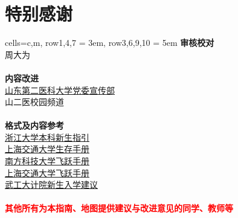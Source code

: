 \chapter*{特别感谢}
\noindent\begin{table*}[h]
    \centering
    \begin{tblr}{
        cells={c,m},
        row{1,4,7} = {3em},
        row{3,6,9,10} = {5em}
            }
        {\large\textbf{审核校对}}          \\
        {周大为}            \\
        \\
        {\large\textbf{内容改进}}                 \\
        {\uline{\href{https://xchb.sdsmu.edu.cn/}{山东第二医科大学党委宣传部}}              \\
        山二医校园频道}                                                                     \\
        \\
        {\large\textbf{格式及内容参考}}         \\
        
        {\uline{\href{https://zjuers.com/welcome/}{浙江大学本科新生指引}}\\
        \uline{\href{https://survivesjtu.gitbook.io/survivesjtumanual}{上海交通大学生存手册}} \\
        \uline{\href{https://sustech-application.com/}{南方科技大学飞跃手册}}                  \\
        \uline{\href{https://survivesjtu.github.io/SJTU-Application/}{上海交通大学飞跃手册}}  \\
        \uline{\href{https://gitee.com/hanyaner/witjij}{武工大计院新生入学建议}}}\\
        \\
        {\large\textbf{\textcolor{red}{其他所有为本指南、地图提供建议与改进意见的同学、教师等}}}
    \end{tblr}

\end{table*}